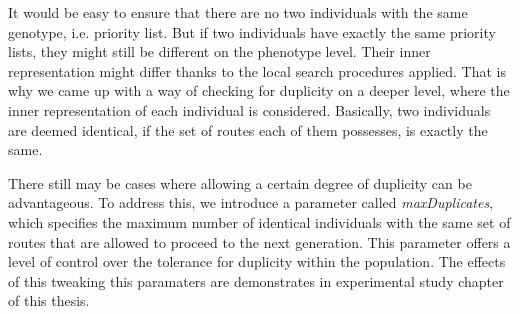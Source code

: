 \documentclass[twoside]{ctuthesis}
\theoremstyle{plain}
\theoremstyle{definition}
\theoremstyle{note}
\begin{document}
It would be easy to ensure that there are no two individuals with the same genotype, i.e. priority list. But if two individuals have exactly the same priority lists, they might still be different on the phenotype level. Their inner representation might differ thanks to the local search procedures applied. That is why we came up with a way of checking for duplicity on a deeper level, where the inner representation of each individual is considered. Basically, two individuals are deemed identical, if the set of routes each of them possesses, is exactly the same.

There still may be cases where allowing a certain degree of duplicity can be advantageous. To address this, we introduce a parameter called \emph{maxDuplicates}, which specifies the maximum number of identical individuals with the same set of routes that are allowed to proceed to the next generation. This parameter offers a level of control over the tolerance for duplicity within the population. The effects of this tweaking this paramaters are demonstrates in experimental study chapter of this thesis.
\end{document}
